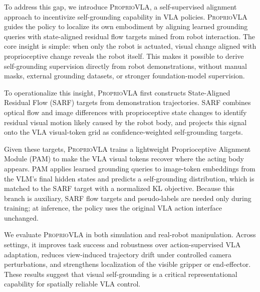 To address this gap, we introduce \textsc{ProprioVLA}, a self-supervised
alignment approach to incentivize self-grounding capability in VLA policies.
\textsc{ProprioVLA} guides the policy to localize its own embodiment by
aligning learned grounding queries with state-aligned residual flow targets
mined from robot interaction. The core insight is simple: when only the robot is
actuated, visual change aligned with proprioceptive change reveals the robot
itself. This makes it possible to derive self-grounding supervision directly
from robot demonstrations, without manual masks, external grounding datasets,
or stronger foundation-model supervision.

To operationalize this insight, \textsc{ProprioVLA} first constructs State-Aligned Residual Flow (SARF) targets
from demonstration trajectories. SARF combines optical flow and image
differences with proprioceptive state changes to identify residual visual
motion likely caused by the robot body, and projects this signal onto the VLA
visual-token grid as confidence-weighted self-grounding targets.

Given these targets, \textsc{ProprioVLA} trains a lightweight Proprioceptive
Alignment Module (PAM) to make the VLA visual tokens recover where the acting
body appears. PAM applies learned grounding queries to image-token embeddings
from the VLM's final hidden states and predicts a self-grounding distribution,
which is matched to the SARF target with a normalized KL objective. Because
this branch is auxiliary, SARF flow targets and pseudo-labels are needed only
during training; at inference, the policy uses the original VLA action
interface unchanged.

We evaluate \textsc{ProprioVLA} in both simulation and real-robot
manipulation. Across settings, it improves task success and robustness over
action-supervised VLA adaptation, reduces view-induced trajectory drift under
controlled camera perturbations, and strengthens localization of the visible
gripper or end-effector. These results suggest that visual self-grounding is a
critical representational capability for spatially reliable VLA control.

